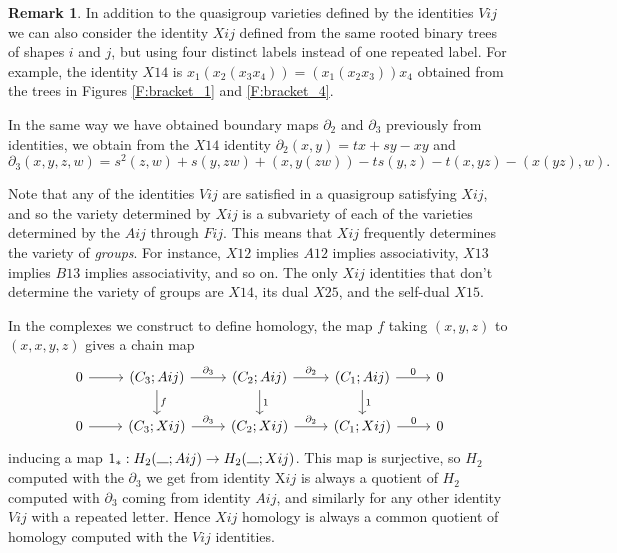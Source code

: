 \documentclass[11pt]{amsart}
\theoremstyle{definition}
\newtheorem{remark}[theorem]{Remark}
\newcommand{\blank}{\rule{.3cm}{0.15mm}}
\begin{document}
\begin{remark}\label{rem:id}
    In addition to the quasigroup varieties defined by the identities $Vij$ we can also consider the identity $Xij$ defined from the same rooted binary trees of shapes $i$ and $j$, but using four distinct labels instead of one repeated label. For example, the identity $X14$ is $x_1(x_2(x_3x_4)) = (x_1(x_2x_3))x_4$ obtained from the trees in Figures \ref{F:bracket_1} and \ref{F:bracket_4}. 

    In the same way we have obtained boundary maps $\partial_2$ and $\partial_3$ previously from identities, we obtain from the $X14$ identity $\partial_2(x,y) = tx + sy - xy$ and \[ \partial_3(x,y,z,w) = s^2(z,w) + s(y,zw) + (x, y(zw)) - ts(y,z) - t(x,yz) - (x(yz),w). \]

    Note that any of the identities $Vij$ are satisfied in a quasigroup satisfying $Xij$, and so the variety determined by $Xij$ is a subvariety of each of the varieties determined by the $Aij$ through $Fij$. This means that $Xij$ frequently determines the variety of {\it groups}. For instance, $X12$ implies $A12$ implies associativity, $X13$ implies $B13$ implies associativity, and so on. The only $Xij$ identities that don't determine the variety of groups are $X14$, its dual $X25$, and the self-dual $X15$.
    
    

    In the complexes we construct to define homology, the map $f$ taking $(x,y,z)$ to $(x,x,y,z)$ gives a chain map \[ \begin{tikzcd}
        0 \arrow[r] & (C_3;Aij) \arrow[r, "\partial_3"] \arrow[d, "f"] & (C_2;Aij) \arrow[r, "\partial_2"] \arrow[d, "1"] & (C_1;Aij) \arrow[r, "0"] \arrow[d, "1"] & 0 \\
        0 \arrow[r] & (C_3;Xij) \arrow[r, "\partial_3"] & (C_2;Xij) \arrow[r, "\partial_2"] & (C_1;Xij) \arrow[r, "0"] & 0 
    \end{tikzcd} \] inducing a map $1_*: H_2(\blank; Aij) \to H_2(\blank; Xij)$. This map is surjective, so $H_2$ computed with the $\partial_3$ we get from identity X$ij$ is always a quotient of $H_2$ computed with $\partial_3$ coming from identity $Aij$, and similarly for any other identity $Vij$ with a repeated letter. Hence $Xij$ homology is always a common quotient of homology computed with the $Vij$ identities. 
\end{remark}
\end{document}
